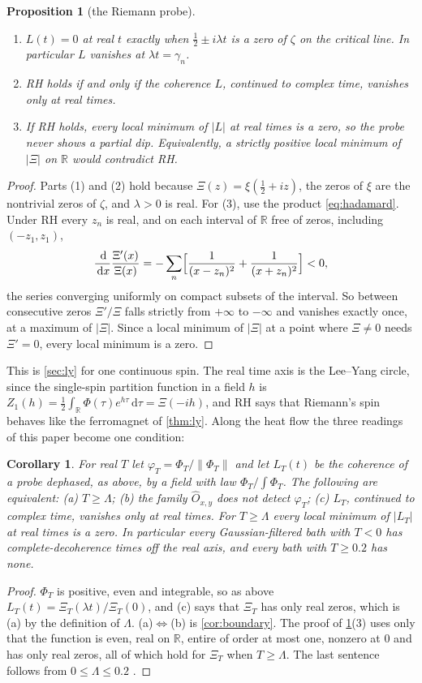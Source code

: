 \documentclass[11pt]{article}
\newtheorem{proposition}[theorem]{Proposition}
\newtheorem{corollary}[theorem]{Corollary}
\theoremstyle{definition}\newtheorem{definition}[theorem]{Definition}
\theoremstyle{remark}\newtheorem{remark}[theorem]{Remark}
\newcommand{\R}{\mathbb R}\newcommand{\C}{\mathbb C}\newcommand{\N}{\mathbb N}
\newcommand{\dd}{\,\mathrm d}\newcommand{\e}{\mathrm e}
\begin{document}
\begin{proposition}[the Riemann probe]\label{prop:riemann}
\begin{enumerate}
\item $L(t)=0$ at real $t$ exactly when $\frac12\pm i\lambda t$ is a zero of $\zeta$ on the critical line. In particular $L$ vanishes at $\lambda t=\gamma_n$.
\item RH holds if and only if the coherence $L$, continued to complex time, vanishes only at real times.
\item If RH holds, every local minimum of $|L|$ at real times is a zero, so the probe never shows a partial dip. Equivalently, a strictly positive local minimum of $|\Xi|$ on $\R$ would contradict RH.
\end{enumerate}
\end{proposition}
\begin{proof}
Parts (1) and (2) hold because $\Xi(z)=\xi(\frac12+iz)$, the zeros of $\xi$ are the nontrivial zeros of $\zeta$, and $\lambda>0$ is real. For (3), use the product \cref{eq:hadamard}. Under RH every $z_n$ is real, and on each interval of $\R$ free of zeros, including $(-z_1,z_1)$,
\[
\frac{\dd}{\dd x}\frac{\Xi'(x)}{\Xi(x)}=-\sum_n\Bigl[\frac1{(x-z_n)^2}+\frac1{(x+z_n)^2}\Bigr]<0 ,
\]
the series converging uniformly on compact subsets of the interval. So between consecutive zeros $\Xi'/\Xi$ falls strictly from $+\infty$ to $-\infty$ and vanishes exactly once, at a maximum of $|\Xi|$. Since a local minimum of $|\Xi|$ at a point where $\Xi\ne0$ needs $\Xi'=0$, every local minimum is a zero.
\end{proof}
This is \cref{sec:ly} for one continuous spin. The real time axis is the Lee--Yang circle, since the single-spin partition function in a field $h$ is $Z_1(h)=\frac12\int_\R\Phi(\tau)e^{h\tau}\dd\tau=\Xi(-ih)$, and RH says that Riemann's spin behaves like the ferromagnet of \cref{thm:ly}. Along the heat flow the three readings of this paper become one condition:

\begin{corollary}\label{cor:three}
For real $T$ let $\varphi_T=\Phi_T/\|\Phi_T\|$ and let $L_T(t)$ be the coherence of a probe dephased, as above, by a field with law $\Phi_T/\int\Phi_T$. The following are equivalent: (a) $T\ge\Lambda$; (b) the family $\hat O_{x,y}$ does not detect $\varphi_T$; (c) $L_T$, continued to complex time, vanishes only at real times. For $T\ge\Lambda$ every local minimum of $|L_T|$ at real times is a zero. In particular every Gaussian-filtered bath with $T<0$ has complete-decoherence times off the real axis, and every bath with $T\ge0.2$ has none.
\end{corollary}
\begin{proof}
$\Phi_T$ is positive, even and integrable, so as above $L_T(t)=\Xi_T(\lambda t)/\Xi_T(0)$, and (c) says that $\Xi_T$ has only real zeros, which is (a) by the definition of $\Lambda$. (a)$\Leftrightarrow$(b) is \cref{cor:boundary}. The proof of \cref{prop:riemann}(3) uses only that the function is even, real on $\R$, entire of order at most one, nonzero at $0$ and has only real zeros, all of which hold for $\Xi_T$ when $T\ge\Lambda$. The last sentence follows from $0\le\Lambda\le0.2$ \cite{RT,PT}.
\end{proof}
\end{document}
